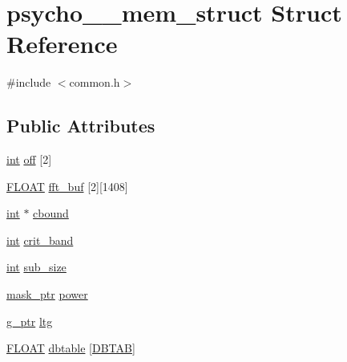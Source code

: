 \hypertarget{structpsycho__1__mem__struct}{}\section{psycho\+\_\+\_\+mem\+\_\+struct Struct Reference}
\label{structpsycho__1__mem__struct}


{\ttfamily \#include $<$common.\+h$>$}

\subsection*{Public Attributes}
\begin{DoxyCompactItemize}
\item 
\hyperlink{xmltok_8h_a5a0d4a5641ce434f1d23533f2b2e6653}{int} \hyperlink{structpsycho__1__mem__struct_af017ea48db79318795b4324e9d4ed1c2}{off} \mbox{[}2\mbox{]}
\item 
\hyperlink{twolame_2libtwolame_2common_8h_ae8690abbffa85934d64d545920e2b108}{F\+L\+O\+AT} \hyperlink{structpsycho__1__mem__struct_aa6c016d9438353036cbd1734805d9814}{fft\+\_\+buf} \mbox{[}2\mbox{]}\mbox{[}1408\mbox{]}
\item 
\hyperlink{xmltok_8h_a5a0d4a5641ce434f1d23533f2b2e6653}{int} $\ast$ \hyperlink{structpsycho__1__mem__struct_ad5c10270d0c010701290271dad278c73}{cbound}
\item 
\hyperlink{xmltok_8h_a5a0d4a5641ce434f1d23533f2b2e6653}{int} \hyperlink{structpsycho__1__mem__struct_ad7e94feac1d79c9e5de0414ebad97d5c}{crit\+\_\+band}
\item 
\hyperlink{xmltok_8h_a5a0d4a5641ce434f1d23533f2b2e6653}{int} \hyperlink{structpsycho__1__mem__struct_a2a8a21315b257747eca8b570c91b85a5}{sub\+\_\+size}
\item 
\hyperlink{twolame_2libtwolame_2common_8h_a673db3062644d9cce92f61cc2f3d0c34}{mask\+\_\+ptr} \hyperlink{structpsycho__1__mem__struct_aaef0599267564801453f2bab3048f23f}{power}
\item 
\hyperlink{twolame_2libtwolame_2common_8h_a9df74e827c067b555fc5b8cf7c203a32}{g\+\_\+ptr} \hyperlink{structpsycho__1__mem__struct_a3757d4106ac278c815a5214045286e0c}{ltg}
\item 
\hyperlink{twolame_2libtwolame_2common_8h_ae8690abbffa85934d64d545920e2b108}{F\+L\+O\+AT} \hyperlink{structpsycho__1__mem__struct_ac3ed9fc5d17b6769b607f30b59171f7f}{dbtable} \mbox{[}\hyperlink{twolame_2libtwolame_2common_8h_a5b6a0dc416c04345a9ff28dce6948aff}{D\+B\+T\+AB}\mbox{]}
\end{DoxyCompactItemize}


